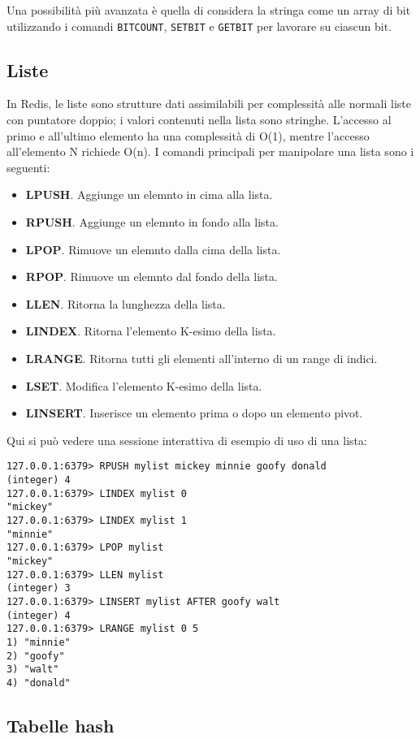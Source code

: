 Una possibilità più avanzata è quella di considera la stringa come un array di bit
utilizzando i comandi \verb|BITCOUNT|, \verb|SETBIT| e \verb|GETBIT| per lavorare
su ciascun bit.

\subsection{Liste}

In Redis, le liste sono strutture dati assimilabili per complessità alle normali
liste con puntatore doppio; i valori contenuti nella lista sono stringhe.
L'accesso al primo e all'ultimo elemento ha una complessità di O(1), mentre
l'accesso all'elemento N richiede O(n). I comandi principali per manipolare una
lista sono i seguenti:

\begin{itemize}
	\medskip
	\item \textbf{LPUSH}. Aggiunge un elemnto in cima alla lista.
	\item \textbf{RPUSH}. Aggiunge un elemnto in fondo alla lista.
	\item \textbf{LPOP}. Rimuove un elemnto dalla cima della lista.
	\item \textbf{RPOP}. Rimuove un elemnto dal fondo della lista.
	\item \textbf{LLEN}. Ritorna la lunghezza della lista.
	\item \textbf{LINDEX}. Ritorna l'elemento K-esimo della lista.
	\item \textbf{LRANGE}. Ritorna tutti gli elementi all'interno di un range di indici.
	\item \textbf{LSET}. Modifica l'elemento K-esimo della lista.
	\item \textbf{LINSERT}. Inserisce un elemento prima o dopo un elemento pivot.
\end{itemize}

Qui si può vedere una sessione interattiva di esempio di uso di una lista:

\medskip
\begin{lstlisting}
127.0.0.1:6379> RPUSH mylist mickey minnie goofy donald
(integer) 4
127.0.0.1:6379> LINDEX mylist 0
"mickey"
127.0.0.1:6379> LINDEX mylist 1
"minnie"
127.0.0.1:6379> LPOP mylist
"mickey"
127.0.0.1:6379> LLEN mylist
(integer) 3
127.0.0.1:6379> LINSERT mylist AFTER goofy walt
(integer) 4
127.0.0.1:6379> LRANGE mylist 0 5
1) "minnie"
2) "goofy"
3) "walt"
4) "donald"
\end{lstlisting}

\subsection{Tabelle hash}

